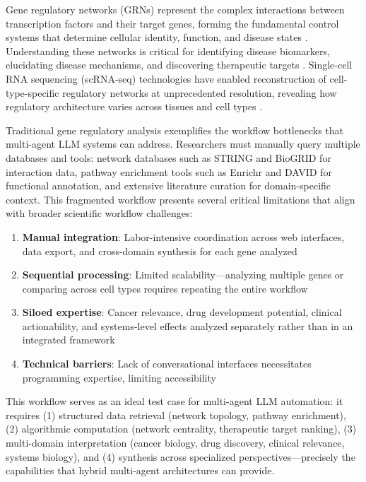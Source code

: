 \documentclass[11pt]{article}
\begin{document}
Gene regulatory networks (GRNs) represent the complex interactions between transcription factors and their target genes, forming the fundamental control systems that determine cellular identity, function, and disease states \cite{babu2004,davidson2008}. Understanding these networks is critical for identifying disease biomarkers, elucidating disease mechanisms, and discovering therapeutic targets \cite{califano2017,sonawane2017}. Single-cell RNA sequencing (scRNA-seq) technologies have enabled reconstruction of cell-type-specific regulatory networks at unprecedented resolution, revealing how regulatory architecture varies across tissues and cell types \cite{aibar2017,kamimoto2023}.

Traditional gene regulatory analysis exemplifies the workflow bottlenecks that multi-agent LLM systems can address. Researchers must manually query multiple databases and tools: network databases such as STRING \cite{string2021} and BioGRID \cite{biogrid2021} for interaction data, pathway enrichment tools such as Enrichr \cite{enrichr2013} and DAVID \cite{david2022} for functional annotation, and extensive literature curation for domain-specific context. This fragmented workflow presents several critical limitations that align with broader scientific workflow challenges:

\begin{enumerate}
\item \textbf{Manual integration}: Labor-intensive coordination across web interfaces, data export, and cross-domain synthesis for each gene analyzed
\item \textbf{Sequential processing}: Limited scalability---analyzing multiple genes or comparing across cell types requires repeating the entire workflow
\item \textbf{Siloed expertise}: Cancer relevance, drug development potential, clinical actionability, and systems-level effects analyzed separately rather than in an integrated framework
\item \textbf{Technical barriers}: Lack of conversational interfaces necessitates programming expertise, limiting accessibility
\end{enumerate}

This workflow serves as an ideal test case for multi-agent LLM automation: it requires (1) structured data retrieval (network topology, pathway enrichment), (2) algorithmic computation (network centrality, therapeutic target ranking), (3) multi-domain interpretation (cancer biology, drug discovery, clinical relevance, systems biology), and (4) synthesis across specialized perspectives---precisely the capabilities that hybrid multi-agent architectures can provide.
\end{document}
